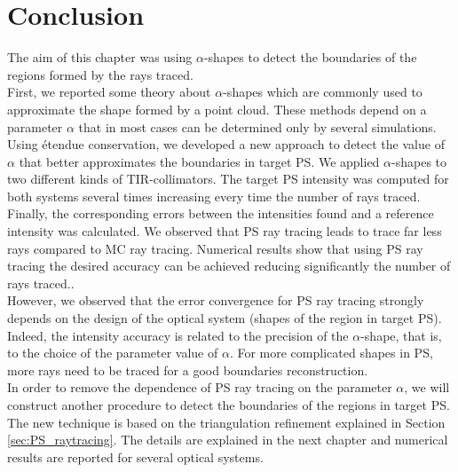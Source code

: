 \section{Conclusion}
The aim of this chapter was using $\alpha$-shapes to detect the boundaries of the regions formed by the rays traced.\\
\indent First, we reported some theory about $\alpha$-shapes which are commonly used to approximate the shape formed by a point cloud. 
These methods depend on a parameter $\alpha$ that in most cases can be determined only by several simulations. 
\\ \indent Using \'{e}tendue conservation, we developed a new approach to detect the value of $\alpha$ that better approximates the boundaries in target PS. 
We applied $\alpha$-shapes to two different kinds of TIR-collimators. The target PS intensity was computed for both systems several times increasing every time the number of rays traced. Finally, the corresponding errors between the intensities found and a reference intensity was calculated. We observed that PS ray tracing leads to trace far less rays compared to MC ray tracing. Numerical results show that using PS ray tracing the desired accuracy can be achieved reducing significantly the number of rays traced..\\ \indent 
However, we observed that the error convergence for PS ray tracing strongly depends on the design of the optical system (shapes of the region in target PS). Indeed, the intensity accuracy is related to the precision of the $\alpha$-shape, that is, to the choice of the parameter value of $\alpha$. For more complicated shapes in PS, more rays need to be traced for a good boundaries reconstruction.\\ \indent
In order to remove the dependence of PS ray tracing on the parameter $\alpha$, we will construct another procedure to detect the boundaries of the regions in target PS. 
The new technique is based on the triangulation refinement explained in Section \ref{sec:PS_raytracing}. The details are explained in the next chapter and numerical results are reported for several optical systems. 











































